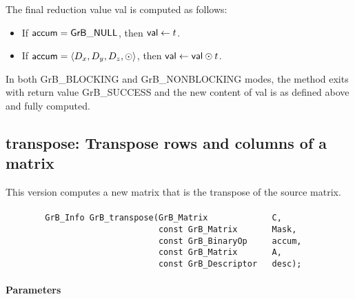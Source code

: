 The final reduction value {\sf val} is computed as follows:
\begin{itemize}
	\item If ${\sf accum} = {\sf GrB\_NULL}$, then ${\sf val} \leftarrow t$.

	\item If ${\sf accum} = \langle D_x, D_y, D_z, \odot \rangle$, then ${\sf val} \leftarrow {\sf val} \odot t$. 
\end{itemize}

In both {\sf GrB\_BLOCKING} and {\sf GrB\_NONBLOCKING}  modes, the method exits with return value 
{\sf GrB\_SUCCESS} and the new content of {\sf val} is as defined above
and fully computed.  



\subsection{{\sf transpose}: Transpose rows and columns of a matrix}

This version computes a new matrix that is the transpose of the source matrix.

\paragraph{\syntax}

\begin{verbatim}
        GrB_Info GrB_transpose(GrB_Matrix             C,
                               const GrB_Matrix       Mask,
                               const GrB_BinaryOp     accum,
                               const GrB_Matrix       A,
                               const GrB_Descriptor   desc);
\end{verbatim}

\paragraph{Parameters}

